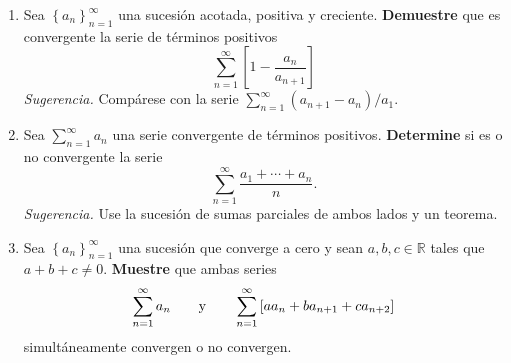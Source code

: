 \documentclass[12pt]{article}
\begin{document}
\begin{enumerate}
    \item Sea $\left\{a_n\right\}_{n=1}^{\infty}$ una sucesión acotada, positiva y creciente. \textbf{Demuestre} que es convergente la serie de términos positivos
    \begin{equation*}
        \sum_{n=1}^{\infty}\left[1-\frac{a_n}{a_{n+1}}\right]
    \end{equation*}
    \textit{Sugerencia.} Compárese con la serie $\sum_{n=1}^{\infty}(a_{n+1}-a_n)/a_1$.
    \item Sea $\sum_{n=1}^{\infty}a_n$ una serie convergente de términos positivos. \textbf{Determine} si es o no convergente la serie
    \begin{equation*}
        \sum_{n=1}^{\infty}\frac{a_1+\cdots+a_n}{n}.
    \end{equation*}
    \textit{Sugerencia.} Use la sucesión de sumas parciales de ambos lados y un teorema.
    \item Sea $\left\{a_n\right\}_{n=1}^{\infty}$ una sucesión que converge a cero y sean $a,b,c\in\mathbb{R}$ tales que $a+b+c\neq0$. \textbf{Muestre} que ambas series
    \begin{equation*}
        \sum_{n=1}^{\infty}a_n\qquad\textup{y}\qquad\sum_{n=1}^{\infty}\left[aa_n+ba_{n+1}+ca_{n+2}\right]
    \end{equation*}
    simultáneamente convergen o no convergen.


\end{enumerate}
\end{document}
